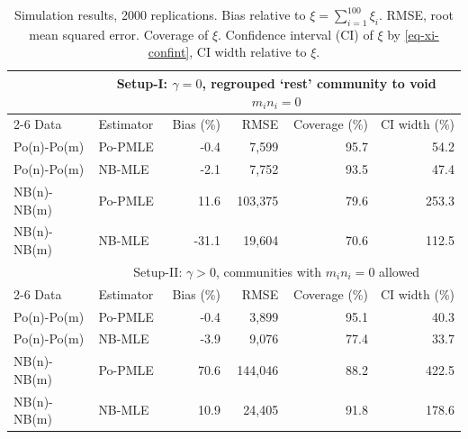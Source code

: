 \begin{table}[H]
\centering
\caption{\label{tbl-sim-summary}Simulation results, 2000 replications. Bias relative to $\xi = \sum_{i=1}^{100} \xi_i$. RMSE, root mean squared error. Coverage of $\xi$. Confidence interval (CI) of $\xi$ by \eqref{eq-xi-confint}, CI width relative to $\xi$.}
\begin{tabular}{llrrrr} \toprule
& \multicolumn{5}{c}{Setup-I: $\gamma =0$, regrouped `rest' community to void $m_i n_i =0$} \\ \cline{2-6}
Data & Estimator & Bias (\%) & RMSE & Coverage (\%) & CI width (\%)\\ \midrule
Po(n)-Po(m) & Po-PMLE & -0.4 & 7,599 & 95.7 & 54.2 \\
Po(n)-Po(m) & NB-MLE & -2.1 & 7,752 & 93.5 & 47.4 \\
NB(n)-NB(m) & Po-PMLE & 11.6 & 103,375 & 79.6 & 253.3 \\
NB(n)-NB(m) & NB-MLE & -31.1 & 19,604 & 70.6 & 112.5 \\
\bottomrule
& \multicolumn{5}{c}{Setup-II: $\gamma >0$, communities with $m_i n_i =0$ allowed}\\ \cline{2-6}
Data & Estimator & Bias (\%) & RMSE & Coverage (\%) & CI width (\%)\\ \midrule
Po(n)-Po(m) & Po-PMLE & -0.4 & 3,899 & 95.1 & 40.3 \\
Po(n)-Po(m) & NB-MLE & -3.9 & 9,076 & 77.4 & 33.7 \\
NB(n)-NB(m) & Po-PMLE & 70.6 & 144,046 & 88.2 & 422.5 \\
NB(n)-NB(m) & NB-MLE & 10.9 & 24,405 & 91.8 & 178.6 \\
\bottomrule
\end{tabular}
\end{table}
